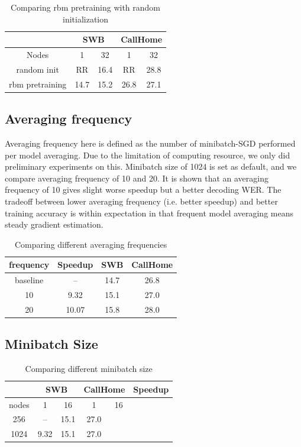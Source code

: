 \documentclass{article}
\begin{document}
\begin{table}
  \centering
  \begin{tabular}{c|c|c|c|c}
    \hline
    & \multicolumn{2}{c|}{SWB}  & \multicolumn{2}{c}{CallHome} \\
    \hline
    Nodes          &  1     & 32     &   1    & 32\\
    \hline
    random init     & RR    & 16.4   &  RR    & 28.8 \\
    \hline
    rbm pretraining & 14.7  & 15.2   & 26.8   & 27.1 \\
    \hline
  \end{tabular}
  \caption{Comparing rbm pretraining with random initialization}
  \label{tab:init}
\end{table}

\subsection{Averaging frequency}
Averaging frequency here is defined as the number of minibatch-SGD performed per model averaging.
Due to the limitation of computing resource, we only did preliminary experiments on this. Minibatch size of 1024 
is set as default, and we compare averaging frequency of 10 and 20. It is shown that an averaging frequency of 10 gives
slight worse speedup but a better decoding WER. The tradeoff between lower averaging frequency (i.e. better speedup) and
better training accuracy is within expectation in that frequent model averaging means steady gradient estimation.

\begin{table}
  \centering
  \begin{tabular}{c|c|c|c}
    \hline
    frequency   & Speedup   & SWB   & CallHome \\
    \hline
    baseline    &   --      & 14.7  & 26.8\\
    \hline
    10          & 9.32      & 15.1  & 27.0 \\
    \hline
    20          & 10.07     & 15.8  & 28.0 \\
    \hline
  \end{tabular}
  \caption{Comparing different averaging frequencies}
  \label{tab:init}
\end{table}

\subsection{Minibatch Size}
\begin{table}
  \centering
  \begin{tabular}{c|c|c|c|c|c}
    \hline
    & \multicolumn{2}{c|}{SWB}    & \multicolumn{2}{c}{CallHome} & Speedup\\
    \hline
    nodes       &  1    &   16    &    1       &   16   &    \\
    \hline
    256         &  --      & 15.1  & 27.0     &   & \\
    \hline
    1024        & 9.32     & 15.1  & 27.0     &   & \\
    \hline
  \end{tabular}
  \caption{Comparing different minibatch size}
  \label{tab:init}
\end{table}
\end{document}

